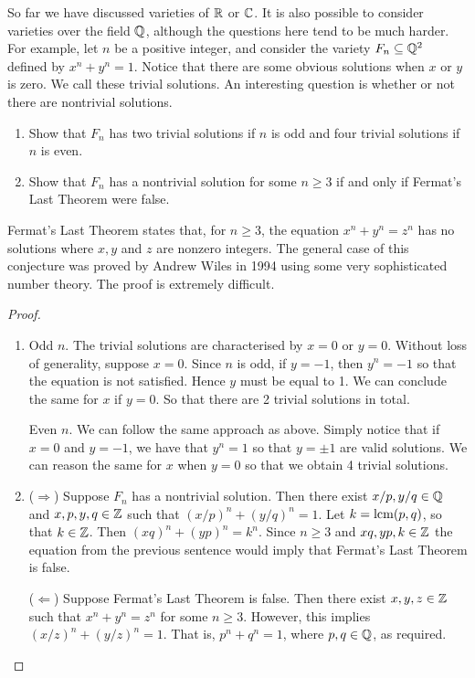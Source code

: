 \begin{exercise}{11}
So far we have discussed varieties of $\mathbb{R}$ or $\mathbb{C}$. It is also possible to consider varieties over the field $\mathbb{Q}$, although the questions here tend to be much harder. For example, let $n$ be a positive integer, and consider the variety $F_n\subseteq\mathbb{Q}^2$ defined by $x^n+y^n=1$. Notice that there are some obvious solutions when $x$ or $y$ is zero. We call these trivial solutions. An interesting question is whether or not there are nontrivial solutions.
\begin{enumerate}
    \item Show that $F_n$ has two trivial solutions if $n$ is odd and four trivial solutions if $n$ is even.
    \item Show that $F_n$ has a nontrivial solution for some $n\geq 3$ if and only if Fermat's Last Theorem were false.
\end{enumerate}
Fermat's Last Theorem states that, for $n\geq 3$, the equation $x^n+y^n=z^n$ has no solutions where $x,y$ and $z$ are nonzero integers. The general case of this conjecture was proved by Andrew Wiles in 1994 using some very sophisticated number theory. The proof is extremely difficult.
\end{exercise}
\begin{proof}
    \begin{enumerate}
        \item Odd $n$. The trivial solutions are characterised by $x=0$ or $y=0$. Without loss of generality, suppose $x=0$. Since $n$ is odd, if $y=-1$, then $y^n=-1$ so that the equation is not satisfied. Hence $y$ must be equal to 1. We can conclude the same for $x$ if $y=0$. So that there are 2 trivial solutions in total.

        Even $n$. We can follow the same approach as above. Simply notice that if $x=0$ and $y=-1$, we have that $y^n=1$ so that  $y=\pm1$ are valid solutions. We can reason the same for $x$ when $y=0$ so that we obtain 4 trivial solutions.
        \item ($\Rightarrow$) Suppose $F_n$ has a nontrivial solution. Then there exist $x/p,y/q\in\mathbb{Q}$ and $x,p,y,q\in\mathbb{Z}$ such that $(x/p)^n+(y/q)^n=1$. Let $k=\operatorname*{lcm}(p,q)$, so that $k\in\mathbb{Z}$. Then $(xq)^n+(yp)^n=k^n$. Since $n\geq 3$ and $xq,yp,k\in\mathbb{Z}$ the equation from the previous sentence would imply that Fermat's Last Theorem is false.

        ($\Leftarrow$) Suppose Fermat's Last Theorem is false. Then there exist $x,y,z\in\mathbb{Z}$ such that $x^n+y^n=z^n$ for some $n\geq 3$. However, this implies $(x/z)^n+(y/z)^n=1$. That is, $p^n+q^n=1$, where $p,q\in\mathbb{Q}$, as required.
    \end{enumerate}
\end{proof}


